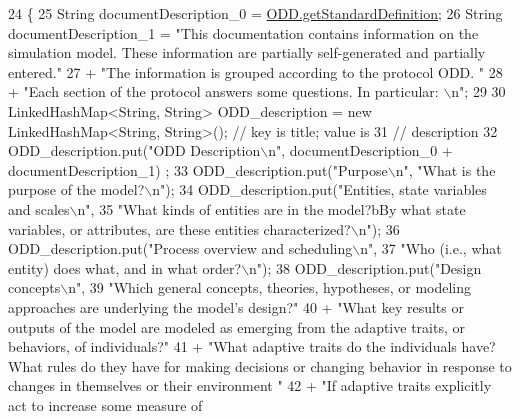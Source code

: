 \begin{DoxyCode}
24                                                                    \{
25         String documentDescription\_0 = \hyperlink{classit_1_1isislab_1_1masonhelperdocumentation_1_1_o_d_d_1_1_o_d_d_a59845141b2e1b45c7586aa3a3cbc493c}{ODD.getStandardDefinition};
26         String documentDescription\_1 = \textcolor{stringliteral}{"This documentation contains information on the simulation model.
       These information are partially self-generated and partially entered."}
27                 + \textcolor{stringliteral}{"The information is grouped according to the protocol ODD. "}
28                 + \textcolor{stringliteral}{"Each section of the protocol answers some questions. In particular: \(\backslash\)n"};
29         
30         LinkedHashMap<String, String> ODD\_description = \textcolor{keyword}{new} LinkedHashMap<String, String>(); \textcolor{comment}{// key is
       title; value is}
31                                                         \textcolor{comment}{// description}
32         ODD\_description.put(\textcolor{stringliteral}{"ODD Description\(\backslash\)n"}, documentDescription\_0 + documentDescription\_1) ;
33         ODD\_description.put(\textcolor{stringliteral}{"Purpose\(\backslash\)n"}, \textcolor{stringliteral}{"What is the purpose of the model?\(\backslash\)n"});
34         ODD\_description.put(\textcolor{stringliteral}{"Entities, state variables and scales\(\backslash\)n"},
35                         \textcolor{stringliteral}{"What kinds of entities are in the model?bBy what state variables, or attributes,
       are these entities characterized?\(\backslash\)n"});
36         ODD\_description.put(\textcolor{stringliteral}{"Process overview and scheduling\(\backslash\)n"},
37                 \textcolor{stringliteral}{"Who (i.e., what entity) does what, and in what order?\(\backslash\)n"});
38         ODD\_description.put(\textcolor{stringliteral}{"Design concepts\(\backslash\)n"},
39                         \textcolor{stringliteral}{"Which general concepts, theories, hypotheses, or modeling approaches are
       underlying the model's design?"}
40                                 + \textcolor{stringliteral}{"What key results or outputs of the model are modeled as emerging from
       the adaptive traits, or behaviors, of individuals?"}
41                                 + \textcolor{stringliteral}{"What adaptive traits do the individuals have? What rules do they have
       for making decisions or changing behavior in response to changes in themselves or their environment "}
42                                 + \textcolor{stringliteral}{"If adaptive traits explicitly act to increase some measure of
}
\end{DoxyCode}
